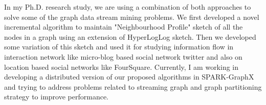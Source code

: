In my Ph.D. research study, we are using a combination of both approaches to solve some of the graph data stream mining problems. We first developed a novel incremental algorithm to maintain "Neighbourhood Profile" sketch of all the nodes in a graph using an extension of HyperLogLog sketch. Then we developed some variation of this sketch and used it for studying information flow in interaction network like micro-blog based social network twitter and also on location based social networks like FourSquare. Currently, I am working in developing a distributed version of our proposed algorithms in SPARK-GraphX and trying to address problems related to streaming graph and graph partitioning strategy to improve performance.

